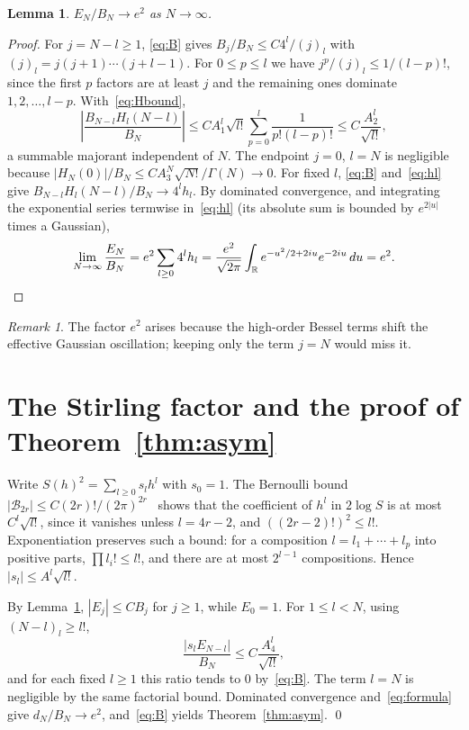 \documentclass[11pt,a4paper]{article}
\newtheorem{lemma}[theorem]{Lemma}
\theoremstyle{remark}
\newtheorem{remark}[theorem]{Remark}
\begin{document}
\begin{lemma}\label{lem:EN}
$E_N/B_N\to e^2$ as $N\to\infty$.
\end{lemma}

\begin{proof}
For $j=N-l\ge1$, \eqref{eq:B} gives $B_j/B_N\le C4^l/(j)_l$ with $(j)_l=j(j+1)\cdots(j+l-1)$. For $0\le p\le l$ we have $j^p/(j)_l\le1/(l-p)!$, since the first $p$ factors are at least $j$ and the remaining ones dominate $1,2,\dots,l-p$. With~\eqref{eq:Hbound},
\begin{equation}\label{eq:major}
  \left|\frac{B_{N-l}H_l(N-l)}{B_N}\right|\le CA_1^l\sqrt{l!}\sum_{p=0}^l\frac1{p!(l-p)!}\le C\frac{A_2^l}{\sqrt{l!}},
\end{equation}
a summable majorant independent of $N$. The endpoint $j=0$, $l=N$ is negligible because $|H_N(0)|/B_N\le CA_3^N\sqrt{N!}/\Gamma(N)\to0$. For fixed $l$, \eqref{eq:B} and~\eqref{eq:hl} give $B_{N-l}H_l(N-l)/B_N\to4^lh_l$. By dominated convergence, and integrating the exponential series termwise in~\eqref{eq:hl} (its absolute sum is bounded by $e^{2|u|}$ times a Gaussian),
\[
  \lim_{N\to\infty}\frac{E_N}{B_N}=e^2\sum_{l\ge0}4^lh_l=\frac{e^2}{\sqrt{2\pi}}\int_{\mathbb R}e^{-u^2/2+2iu}e^{-2iu}\,du=e^2. \qedhere
\]
\end{proof}

\begin{remark}
The factor $e^2$ arises because the high-order Bessel terms shift the effective Gaussian oscillation; keeping only the term $j=N$ would miss it.
\end{remark}

\section{The Stirling factor and the proof of Theorem~\ref{thm:asym}}\label{sec:stirling}

Write $S(h)^2=\sum_{l\ge0}s_lh^l$ with $s_0=1$. The Bernoulli bound $|\mathcal B_{2r}|\le C(2r)!/(2\pi)^{2r}$~\cite[24.11]{DLMF} shows that the coefficient of $h^l$ in $2\log S$ is at most $C^l\sqrt{l!}$, since it vanishes unless $l=4r-2$, and $((2r-2)!)^2\le l!$. Exponentiation preserves such a bound: for a composition $l=l_1+\cdots+l_p$ into positive parts, $\prod l_i!\le l!$, and there are at most $2^{l-1}$ compositions. Hence $|s_l|\le A^l\sqrt{l!}$.

By Lemma~\ref{lem:EN}, $|E_j|\le CB_j$ for $j\ge1$, while $E_0=1$. For $1\le l<N$, using $(N-l)_l\ge l!$,
\[
  \frac{|s_lE_{N-l}|}{B_N}\le C\frac{A_4^l}{\sqrt{l!}},
\]
and for each fixed $l\ge1$ this ratio tends to $0$ by~\eqref{eq:B}. The term $l=N$ is negligible by the same factorial bound. Dominated convergence and~\eqref{eq:formula} give $d_N/B_N\to e^2$, and~\eqref{eq:B} yields Theorem~\ref{thm:asym}. \qed
\end{document}

